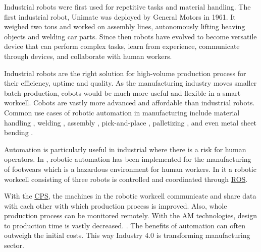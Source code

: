 Industrial robots were first used for repetitive tasks and material handling.
The first industrial robot, Unimate was deployed by General Motors in 1961. It weighed two tons and worked on assembly lines, autonomously lifting heaving objects and welding car parts. 
Since then robots have evolved to become versatile device that can perform complex tasks, learn from experience, communicate through devices, and collaborate with human workers. \cite{firstrobot}

Industrial robots are the right solution for high-volume production process for their efficiency, uptime and quality. \cite{jrautomation} As the manufacturing industry moves smaller batch production, cobots would be much more useful and flexible in a smart workcell. Cobots are vastly more advanced and affordable than industrial robots. \cite{jrautomation2}
Common use cases of robotic automation in manufacturing include material handling \cite{gambao2012new,SKIBNIEWSKI1992251}, welding \cite{tarn2011robotic}, assembly \cite{ji2021learning}, pick-and-place \cite{shah2021design}, palletizing \cite{lee2021intelligent}, and even metal sheet bending \cite{Uhrhan1995}.

Automation is particularly useful in industrial where there is a risk for human operators.
In \cite{10381692}, robotic automation has been implemented for the manufacturing of footwears which is a hazardous environment for human workers.
In it a robotic workcell consisting of three robots is controlled and coordinated through \hyperref[acro:ROS]{ROS}.

With the \hyperref[acro:CPS]{CPS}, the machines in the robotic workcell communicate and share data with each other with which production process is improved. Also, whole production process
can be monitored remotely.\cite[page 105]{li2020robotics} With the AM technologies, design to production time is vastly decreased. \cite[page 116]{li2020robotics}. The benefits of automation can often outweigh the initial costs. This way Industry 4.0 is transforming manufacturing sector. 


